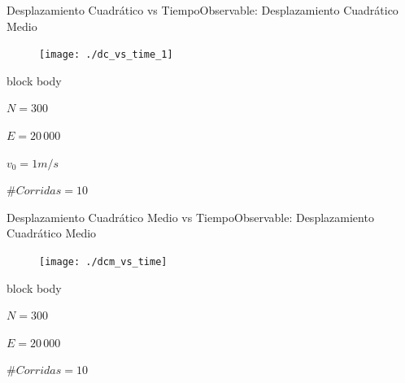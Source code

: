\documentclass{beamer}
\begin{document}
            \begin{frame}{Desplazamiento Cuadrático vs Tiempo}{Observable: Desplazamiento Cuadrático Medio}
                \begin{figure}[H!]
                    \texttt{[image: ./dc\_vs\_time\_1]}
                    \label{fig:dcm_1}
                \end{figure}
                \begin{beamercolorbox}[sep=5pt,center]{block body}
                    \begin{minipage}[t]{0.24\textwidth}
                        \centering
                        \small{$N=300$}
                    \end{minipage}
                    \hfill
                    \begin{minipage}[t]{0.24\textwidth}
                        \centering
                        \small{$E=20\,000$}
                    \end{minipage}
                    \hfill
                    \begin{minipage}[t]{0.24\textwidth}
                        \centering
                        \small{$v_0 = 1 m/s$}
                    \end{minipage}
                    \hfill
                    \begin{minipage}[t]{0.24\textwidth}
                        \centering
                        \small{$\#Corridas = 10$}
                    \end{minipage}
                \end{beamercolorbox}
            \end{frame}

            \begin{frame}{Desplazamiento Cuadrático Medio vs Tiempo}{Observable: Desplazamiento Cuadrático Medio}
                \begin{figure}[H!]
                    \texttt{[image: ./dcm\_vs\_time]}
                    \label{fig:dcm_2}
                \end{figure}
                \begin{beamercolorbox}[sep=5pt,center]{block body}
                    \begin{minipage}[t]{0.3\textwidth}
                        \centering
                        \small{$N=300$}
                    \end{minipage}
                    \hfill
                    \begin{minipage}[t]{0.3\textwidth}
                        \centering
                        \small{$E=20\,000$}
                    \end{minipage}
                    \hfill
                    \begin{minipage}[t]{0.3\textwidth}
                        \centering
                        \small{$\#Corridas = 10$}
                    \end{minipage}
                \end{beamercolorbox}
            \end{frame}
\end{document}

